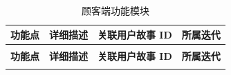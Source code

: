 \begin{longtable}{>{\centering\arraybackslash}m{3cm} >{\centering\arraybackslash}m{6.5cm} >{\centering\arraybackslash}m{2cm} >{\centering\arraybackslash}m{2cm}}

    \caption{顾客端功能模块} \label{tab:training}                                                                       \\

    \toprule
    \textbf{功能点} & \textbf{详细描述}                                            & \textbf{关联用户故事 ID} & \textbf{所属迭代} \\
    \midrule
    \endfirsthead

    \multicolumn{4}{c}{{\tablename\ \thetable{} 续表}}                                                             \\
    \toprule
    \textbf{功能点} & \textbf{详细描述}                                            & \textbf{关联用户故事 ID} & \textbf{所属迭代} \\
    \midrule
    \endhead

    \bottomrule
    \endfoot



\end{longtable}
